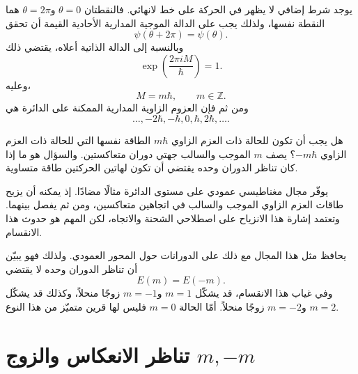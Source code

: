 يوجد شرط إضافي لا يظهر في الحركة على خط لانهائي. فالنقطتان \(\theta=0\) و\(\theta=2\pi\) هما النقطة نفسها، ولذلك يجب على الدالة الموجية المدارية الأحادية القيمة أن تحقق
\begin{equation}
\psi(\theta+2\pi)=\psi(\theta).
\end{equation}
وبالنسبة إلى الدالة الذاتية أعلاه، يقتضي ذلك
\begin{equation}
\exp\left(\frac{2\pi iM}{\hbar}\right)=1.
\end{equation}
وعليه،
\begin{equation}
M=m\hbar,
\qquad
m\in\mathbb Z.
\end{equation}
ومن ثم فإن العزوم الزاوية المدارية الممكنة على الدائرة هي
\begin{equation}
\ldots,-2\hbar,-\hbar,0,\hbar,2\hbar,\ldots.
\end{equation}

هل يجب أن تكون للحالة ذات العزم الزاوي \(m\hbar\) الطاقة نفسها التي للحالة ذات العزم الزاوي \(-m\hbar\)؟ يصف \(m\) الموجب والسالب جهتي دوران متعاكستين. والسؤال هو ما إذا كان تناظر الدوران وحده يقتضي أن تكون لهاتين الحركتين طاقة متساوية.

\begin{classroomqa}
\end{classroomqa}

يوفّر مجال مغناطيسي عمودي على مستوى الدائرة مثالًا مضادًا. إذ يمكنه أن يزيح طاقات العزم الزاوي الموجب والسالب في اتجاهين متعاكسين، ومن ثم يفصل بينهما. وتعتمد إشارة هذا الانزياح على اصطلاحي الشحنة والاتجاه، لكن المهم هو حدوث هذا الانقسام.

يحافظ مثل هذا المجال مع ذلك على الدورانات حول المحور العمودي. ولذلك فهو يبيّن أن تناظر الدوران وحده لا يقتضي
\begin{equation}
E(m)=E(-m).
\end{equation}
وفي غياب هذا الانقسام، قد يشكّل \(m=1\) و\(m=-1\) زوجًا منحلاً، وكذلك قد يشكّل \(m=2\) و\(m=-2\) زوجًا منحلاً. أمّا الحالة \(m=0\) فليس لها قرين متميّز من هذا النوع.

\section{تناظر الانعكاس والزوج \texorpdfstring{\(m,-m\)}{m, -m}}

